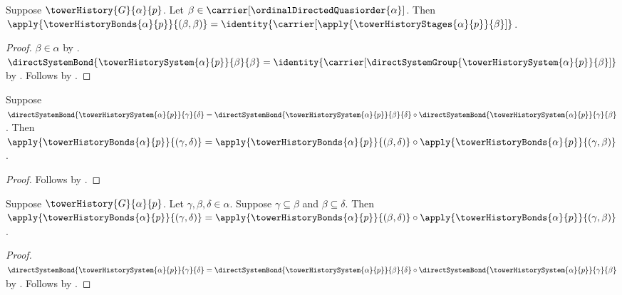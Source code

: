 \begin{proposition}\label{tower_history_bond_family_identity}
    Suppose $\towerHistory{G}{\alpha}{p}$.
    Let $\beta\in\carrier[\ordinalDirectedQuasiorder{\alpha}]$.
    Then $\apply{\towerHistoryBonds{\alpha}{p}}{(\beta,\beta)}
        =\identity{\carrier[
            \apply{\towerHistoryStages{\alpha}{p}}{\beta}]}$.
\end{proposition}
\begin{proof}
    $\beta\in\alpha$ by
        .
    $\directSystemBond{\towerHistorySystem{\alpha}{p}}{\beta}{\beta}
        =\identity{\carrier[
            \directSystemGroup{\towerHistorySystem{\alpha}{p}}{\beta}]}$
        by .
    Follows by
        .
\end{proof}

\begin{proposition}\label{tower_history_bond_family_composition_bridge}
    Suppose
        $\directSystemBond{\towerHistorySystem{\alpha}{p}}{\gamma}{\delta}
        =\directSystemBond{\towerHistorySystem{\alpha}{p}}{\beta}{\delta}
            \circ
         \directSystemBond{\towerHistorySystem{\alpha}{p}}{\gamma}{\beta}$.
    Then $\apply{\towerHistoryBonds{\alpha}{p}}{(\gamma,\delta)}
        =\apply{\towerHistoryBonds{\alpha}{p}}{(\beta,\delta)}\circ
            \apply{\towerHistoryBonds{\alpha}{p}}{(\gamma,\beta)}$.
\end{proposition}
\begin{proof}
    Follows by .
\end{proof}

\begin{proposition}\label{tower_history_bond_family_composition_on_ordinal}
    Suppose $\towerHistory{G}{\alpha}{p}$.
    Let $\gamma,\beta,\delta\in\alpha$.
    Suppose $\gamma\subseteq\beta$ and $\beta\subseteq\delta$.
    Then $\apply{\towerHistoryBonds{\alpha}{p}}{(\gamma,\delta)}
        =\apply{\towerHistoryBonds{\alpha}{p}}{(\beta,\delta)}\circ
            \apply{\towerHistoryBonds{\alpha}{p}}{(\gamma,\beta)}$.
\end{proposition}
\begin{proof}
    $\directSystemBond{\towerHistorySystem{\alpha}{p}}{\gamma}{\delta}
        =\directSystemBond{\towerHistorySystem{\alpha}{p}}{\beta}{\delta}
            \circ
         \directSystemBond{\towerHistorySystem{\alpha}{p}}{\gamma}{\beta}$
        by .
    Follows by
        .
\end{proof}


